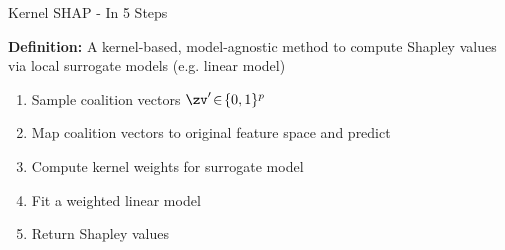 \documentclass[10pt,compress,t,notes=noshow, xcolor=table]{beamer}
\begin{document}
\begin{frame}{Kernel SHAP - In 5 Steps}

\textbf{Definition:} A kernel-based, model-agnostic method to compute Shapley values via local surrogate models (e.g. linear model)\\
\vspace{1cm}
\begin{enumerate}
    \item Sample coalition vectors  \(\zv'\!\in\!\{0,1\}^p\)
    
    \item Map coalition vectors to original feature space and predict
    
    
    \item Compute kernel weights for surrogate model
    
    \item Fit a weighted linear model 

    \item Return Shapley values
    
    
\end{enumerate}

\end{frame}
\end{document}

